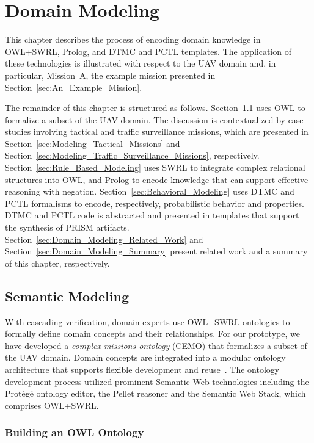 \chapter{Domain Modeling}
\label{chap:Domain_Modeling}

This chapter describes the process of encoding domain knowledge in OWL+SWRL, Prolog, and DTMC and PCTL templates. The application of these technologies is illustrated with respect to the UAV domain and, in particular, Mission~A, the example mission presented in Section~\ref{sec:An_Example_Mission}.

The remainder of this chapter is structured as follows. Section~\ref{sec:Semantic_Modeling} uses OWL to formalize a subset of the UAV domain. The discussion is contextualized by case studies involving tactical and traffic surveillance missions, which are presented in Section~\ref{sec:Modeling_Tactical_Missions} and Section~\ref{sec:Modeling_Traffic_Surveillance_Missions}, respectively. Section~\ref{sec:Rule_Based_Modeling} uses SWRL to integrate complex relational structures into OWL, and Prolog to encode knowledge that can support effective reasoning with negation. Section~\ref{sec:Behavioral_Modeling} uses DTMC and PCTL formalisms to encode, respectively, probabilistic behavior and properties. DTMC and PCTL code is abstracted and presented in templates that support the synthesis of PRISM artifacts. Section~\ref{sec:Domain_Modeling_Related_Work} and Section~\ref{sec:Domain_Modeling_Summary} present related work and a summary of this chapter, respectively.

\section{Semantic Modeling}
\label{sec:Semantic_Modeling}

With cascading verification, domain experts use OWL+SWRL ontologies to formally define domain concepts and their relationships. For our prototype, we have developed a \emph{complex missions ontology} (CEMO) that formalizes a subset of the UAV domain. Domain concepts are integrated into a modular ontology architecture that supports flexible development and reuse~\cite{Bao_2006,Staab_2009}. The ontology development process utilized prominent Semantic Web technologies including the Prot\'{e}g\'{e} ontology editor, the Pellet reasoner and the Semantic Web Stack, which comprises OWL+SWRL\@.

\subsection{Building an OWL Ontology}
\label{sec:Building_an_OWL_Ontology}

